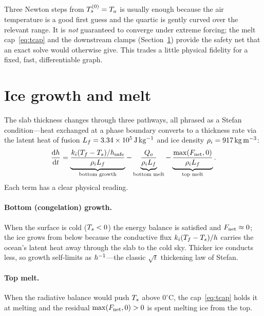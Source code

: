 \begin{remark}
Three Newton steps from $T_{s}^{(0)}=T_a$ is usually enough because the air
temperature is a good first guess and the quartic is gently curved over the
relevant range. It is \emph{not} guaranteed to converge under extreme forcing;
the melt cap~\eqref{eq:tcap} and the downstream clamps
(Section~\ref{sec:growth}) provide the safety net that an exact solve would
otherwise give. This trades a little physical fidelity for a fixed, fast,
differentiable graph.
\end{remark}

\section{Ice growth and melt}\label{sec:growth}

The slab thickness changes through three pathways, all phrased as a Stefan
condition---heat exchanged at a phase boundary converts to a thickness rate via
the latent heat of fusion $L_{f} = 3.34\times10^5\,\mathrm{J\,kg^{-1}}$ and ice
density $\rho_{i} = 917\,\mathrm{kg\,m^{-3}}$:
\begin{equation}
  \frac{\mathrm{d}h}{\mathrm{d}t} = \underbrace{\frac{k_{i}(T_{f}-T_{s})/h_{\mathrm{safe}}}
                                {\rho_{i} L_{f}}}_{\text{bottom growth}}
             - \underbrace{\frac{Q_{o}}{\rho_{i} L_{f}}}_{\text{bottom melt}}
             - \underbrace{\frac{\max(F_{\mathrm{net}},0)}{\rho_{i} L_{f}}}_{\text{top melt}}.
  \label{eq:dhdt}
\end{equation}
Each term has a clear physical reading.

\paragraph{Bottom (congelation) growth.} When the surface is cold ($T_{s}<0$)
the energy balance is satisfied and $F_{\mathrm{net}}\approx 0$; the ice grows from below
because the conductive flux $k_{i}(T_{f}-T_{s})/h$ carries the ocean's latent
heat away through the slab to the cold sky. Thicker ice conducts less, so growth
self-limits as $h^{-1}$---the classic $\sqrt{t}$ thickening law of Stefan.

\paragraph{Top melt.} When the radiative balance would push $T_{s}$ above
$0^\circ\mathrm{C}$, the cap~\eqref{eq:tcap} holds it at melting and the residual
$\max(F_{\mathrm{net}},0)>0$ is spent melting ice from the top.

